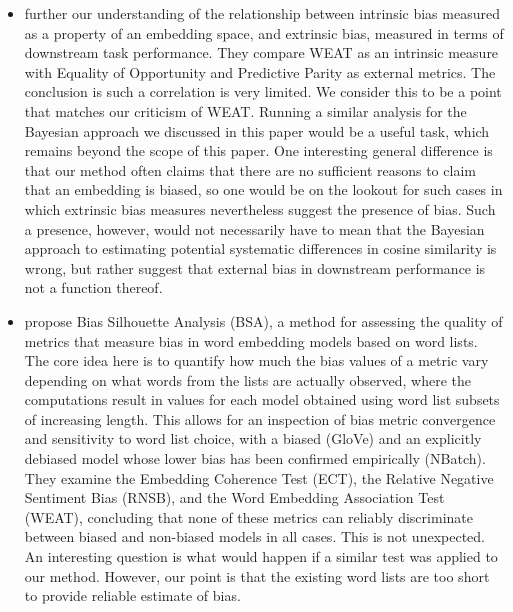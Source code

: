 \documentclass{clv3}
\begin{document}
\begin{itemize}
\item \citet{Goldfarb2021BiasNotCorrelate} further our  understanding of  the relationship between intrinsic bias measured as a property of an embedding space, and extrinsic bias, measured in terms of  downstream task performance. They compare  WEAT as an intrinsic measure with Equality of Opportunity and Predictive Parity as external metrics.  The conclusion is such a  correlation is very limited. We consider this to be a point that matches our criticism of WEAT. Running a similar analysis for the Bayesian approach we discussed in this paper would be a useful task, which remains beyond the scope of this paper. One interesting general difference is that our method often claims that there are no sufficient  reasons to claim that an embedding is biased, so one would be on the lookout for such cases in which extrinsic bias measures nevertheless suggest the presence of bias. Such a presence, however, would not necessarily have to mean that the Bayesian approach to estimating potential systematic differences in cosine similarity is wrong, but rather suggest that external bias in downstream performance is not a function thereof.


\item \citet{Spliethover2021BiasSilhouette} propose Bias Silhouette Analysis (BSA), a method for assessing the quality of metrics that measure bias in word embedding models based on word lists. The core idea here is to quantify how much the bias values of a metric vary depending on what words from the lists are actually observed, where the computations result in  values for each model obtained  using word list subsets of increasing length. This allows for an inspection of bias metric convergence and sensitivity to word list choice, with a biased (GloVe) and an explicitly debiased model whose lower bias has been confirmed empirically (NBatch).  They examine the Embedding Coherence Test (ECT), the Relative Negative Sentiment Bias (RNSB), and the Word Embedding Association Test (WEAT), concluding  that none of these metrics can reliably discriminate between biased and non-biased models in all cases. This is not unexpected. An interesting question is what would happen if a similar test was applied to our method. However, our point is that the existing word lists are too short to provide reliable estimate of bias.


\end{itemize}



\vspace{2mm}
\end{document}
